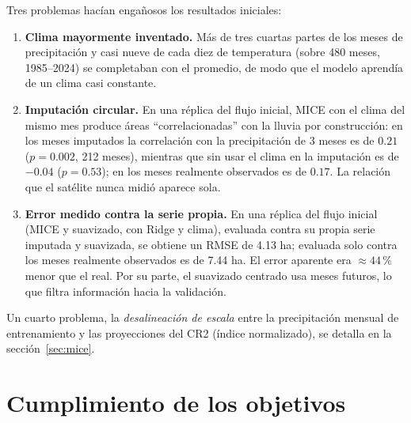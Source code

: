 \documentclass[11pt,a4paper]{article}
\begin{document}
Tres problemas hacían engañosos los resultados iniciales:
\begin{enumerate}
\item \textbf{Clima mayormente inventado.} Más de tres cuartas partes de los meses de precipitación y casi nueve de cada diez de temperatura (sobre 480 meses, 1985--2024) se completaban con el promedio, de modo que el modelo aprendía de un clima casi constante.
\item \textbf{Imputación circular.} En una réplica del flujo inicial, MICE con el clima del mismo mes produce áreas ``correlacionadas'' con la lluvia por construcción: en los meses imputados la correlación con la precipitación de 3 meses es de $0.21$ ($p=0.002$, 212 meses), mientras que sin usar el clima en la imputación es de $-0.04$ ($p=0.53$); en los meses realmente observados es de $0.17$. La relación que el satélite nunca midió aparece sola.
\item \textbf{Error medido contra la serie propia.} En una réplica del flujo inicial (MICE y suavizado, con Ridge y clima), evaluada contra su propia serie imputada y suavizada, se obtiene un RMSE de 4.13 ha; evaluada solo contra los meses realmente observados es de 7.44 ha. El error aparente era ${\approx}44\,\%$ menor que el real. Por su parte, el suavizado centrado usa meses futuros, lo que filtra información hacia la validación.
\end{enumerate}
Un cuarto problema, la \emph{desalineación de escala} entre la precipitación mensual de entrenamiento y las proyecciones del CR2 (índice normalizado), se detalla en la sección~\ref{sec:mice}.

\section{Cumplimiento de los objetivos}
\end{document}
